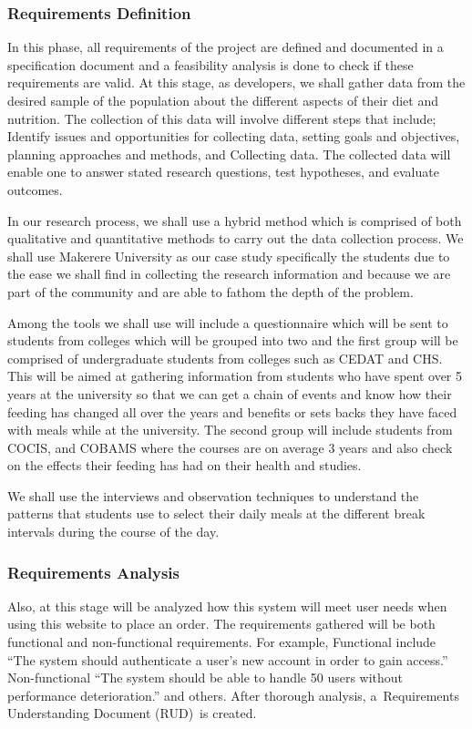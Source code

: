 \documentclass{article}
\begin{document}
\subsubsection{Requirements Definition}
In this phase, all requirements of the project are defined and documented in a specification document and a feasibility analysis is done to check if these requirements are valid. At this stage, as developers, we shall gather data from the desired sample of the population about the different aspects of their diet and nutrition. The collection of this data will involve different steps that include; Identify issues and opportunities for collecting data, setting goals and objectives, planning approaches and methods, and Collecting data. The collected data will enable one to answer stated research questions, test hypotheses, and evaluate outcomes.

In our research process, we shall use a hybrid method which is comprised of both qualitative and quantitative methods to carry out the data collection process. We shall use Makerere University as our case study specifically the students due to the ease we shall find in collecting the research information and because we are part of the community and are able to fathom the depth of the problem.   

Among the tools we shall use will include a questionnaire which will be sent to students from colleges which will be grouped into two and the first group will be comprised of undergraduate students from colleges such as CEDAT and CHS. This will be aimed at gathering information from students who have spent over 5 years at the university so that we can get a chain of events and know how their feeding has changed all over the years and benefits or sets backs they have faced with meals while at the university. The second group will include students from COCIS,  and COBAMS where the courses are on average 3 years and also check on the effects their feeding has had on their health and studies. 

We shall use the interviews and observation techniques to understand the patterns that students use to select their daily meals at the different break intervals during the course of the day.

\subsubsection{Requirements Analysis}
Also, at this stage will be analyzed how this system will meet user needs when using this website to place an order. The requirements gathered will be both functional and non-functional requirements. For example, Functional include “The system should authenticate a user’s new account in order to gain access.” Non-functional “The system should be able to handle 50 users without performance deterioration.” and others. After thorough analysis, a Requirements Understanding Document (RUD) is created.
\end{document}
